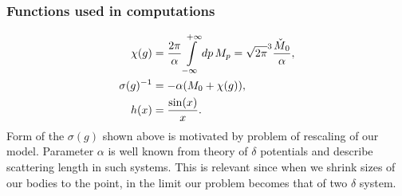 \documentclass[10pt,t]{beamer}
\begin{document}
\begin{frame}
  \frametitle{Functions used in computations}

  \vspace{-2em}


  \begin{subequations}
    \begin{align}
      \label{eq:Scalar-field-and-two-quasi-deltas-07-A}
      \chi( g )
      &=
        \frac{ 2 \pi }{ \alpha }
        \int\limits_{ -\infty }^{ +\infty } dp \, M_{ p } =
        \sqrt{ 2 \pi }^{ 3 } \frac{ \check{M}_{ \hspace{0.05em} 0 } }{ \alpha }, \\
      \label{eq:Scalar-field-and-two-quasi-deltas-07-B}
      \sigma( g )^{ -1 }
      &=
        -\alpha ( M_{ 0 } + \chi( g ) ), \\
      \label{eq:Scalar-field-and-two-quasi-deltas-07-C}
      h( x )
      &=
        \frac{ \sin( x ) }{ x }.
    \end{align}
  \end{subequations}
  Form of the $\sigma( g )$ shown above is motivated by problem of rescaling
  of our model. Parameter $\alpha$ is well known from theory of $\delta$ potentials
  and describe scattering length in such systems. This is relevant
  since when we shrink sizes of our bodies to the point, in the limit
  our problem becomes that of two $\delta$ system.





\end{frame}
\end{document}
